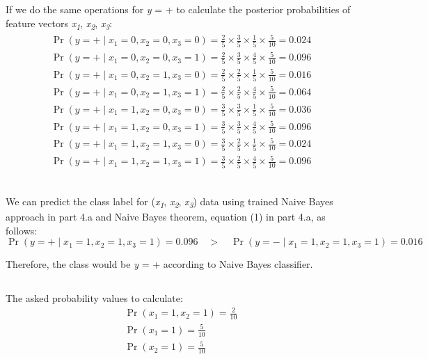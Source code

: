 \documentclass{article}
\DeclareMathOperator{\CondProb}{Pr}
\newcommand{\writex}[2]{{\it{#1\textsubscript#2}}}
\newcommand{\writey}[1]{{\it{#1}}}
\begin{document}
If we do the same operations for  \writey{y} = + to calculate the posterior probabilities of feature vectors \writex{x}{1}, \writex{x}{2}, \writex{x}{3}:
\begin{equation*}
	\begin{aligned}
	\CondProb{(y = +  \mid x_1 = 0, x_2 = 0, x_3 = 0)} = \frac{2}{5}\times\frac{3}{5}\times\frac{1}{5}\times\frac{5}{10} =  0.024 \\
	\CondProb{(y = +  \mid x_1 = 0, x_2 = 0, x_3 = 1)} = \frac{2}{5}\times\frac{3}{5}\times\frac{4}{5}\times\frac{5}{10} =  0.096 \\
	\CondProb{(y = +  \mid x_1 = 0, x_2 = 1, x_3 = 0)} = \frac{2}{5}\times\frac{2}{5}\times\frac{1}{5}\times\frac{5}{10} =  0.016 \\
	\CondProb{(y = +  \mid x_1 = 0, x_2 = 1, x_3 = 1)} = \frac{2}{5}\times\frac{2}{5}\times\frac{4}{5}\times\frac{5}{10} =  0.064 \\
	\CondProb{(y = +  \mid x_1 = 1, x_2 = 0, x_3 = 0)} = \frac{3}{5}\times\frac{3}{5}\times\frac{1}{5}\times\frac{5}{10}  = 0.036 \\
	\CondProb{(y = +  \mid x_1 = 1, x_2 = 0, x_3 = 1)} = \frac{3}{5}\times\frac{3}{5}\times\frac{4}{5}\times\frac{5}{10}  = 0.096 \\
	\CondProb{(y = +  \mid x_1 = 1, x_2 = 1, x_3 = 0)} = \frac{3}{5}\times\frac{2}{5}\times\frac{1}{5}\times\frac{5}{10} =  0.024 \\
	\CondProb{(y = +  \mid x_1 = 1, x_2 = 1, x_3 = 1)} = \frac{3}{5}\times\frac{2}{5}\times\frac{4}{5}\times\frac{5}{10} = 0.096 \\
	\end{aligned}
\end{equation*}

\subsection{}
We can predict the class label for (\writex{x}{1}, \writex{x}{2}, \writex{x}{3}) data using trained Naive Bayes approach in part 4.a and Naive Bayes theorem, equation (1) in part 4.a, as follows:
\begin{equation*}
	\CondProb{(y = +  \mid x_1 = 1, x_2 = 1, x_3 = 1)} = 0.096\quad>\quad\CondProb{(y = -  \mid x_1 = 1, x_2 = 1, x_3 = 1)} = 0.016
\end{equation*}

Therefore, the class would be \writey{y} = + according to Naive Bayes classifier.

\subsection{}
The asked probability values to calculate: 
\begin{equation*}
	\begin{aligned}
	\CondProb{(x_1 = 1, x_2 = 1)} = \frac{2}{10}\\
	\CondProb{(x_1 = 1)} = \frac{5}{10}\\ 
	\CondProb{(x_2 = 1)} = \frac{5}{10}
	\end{aligned}
\end{equation*}
\end{document}
